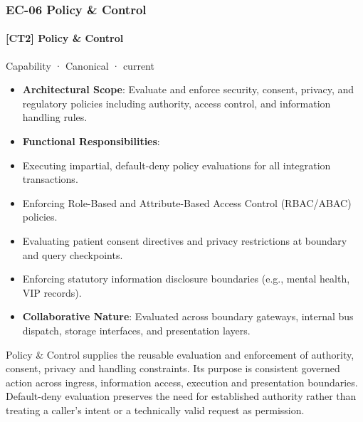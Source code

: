 \subsubsection{EC-06 Policy \& Control}

\paragraph{[CT2] Policy \& Control}

\label{element:0c5d986cc948421a8bebcab3b74d108f}
{\small Capability · Canonical · current}\par

\begin{itemize}


\item \textbf{Architectural Scope}: Evaluate and enforce security, consent, privacy, and regulatory policies including authority, access control, and information handling rules.

\item \textbf{Functional Responsibilities}:

\item Executing impartial, default-deny policy evaluations for all integration transactions.

\item Enforcing Role-Based and Attribute-Based Access Control (RBAC/ABAC) policies.

\item Evaluating patient consent directives and privacy restrictions at boundary and query checkpoints.

\item Enforcing statutory information disclosure boundaries (e.g., mental health, VIP records).

\item \textbf{Collaborative Nature}: Evaluated across boundary gateways, internal bus dispatch, storage interfaces, and presentation layers.

\end{itemize}


Policy \& Control supplies the reusable evaluation and enforcement of authority, consent, privacy and handling constraints. Its purpose is consistent governed action across ingress, information access, execution and presentation boundaries. Default-deny evaluation preserves the need for established authority rather than treating a caller's intent or a technically valid request as permission.



